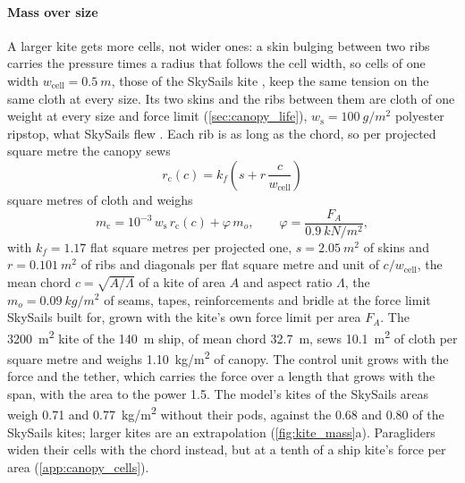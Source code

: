 \paragraph{Mass over size} A larger kite gets more cells, not wider ones: a skin bulging between two ribs carries the pressure times a radius that follows the cell width, so cells of one width $w_\mathrm{cell}=\SI{0.5}{m}$, those of the SkySails kite \citep{folkersma2020}, keep the same tension on the same cloth at every size. Its two skins and the ribs between them are cloth of one weight at every size and force limit (\cref{sec:canopy_life}), $w_\mathrm{s}=\SI{100}{g/m^2}$ polyester ripstop, what SkySails flew \citep{paulig2013}. Each rib is as long as the chord, so per projected square metre the canopy sews
\begin{equation}
r_\mathrm{c}(c) = k_f \left(s + r\,\frac{c}{w_\mathrm{cell}}\right)
\label{eq:canopy_cloth}
\end{equation}
square metres of cloth and weighs
\begin{equation}
m_\mathrm{c} = 10^{-3}\,w_\mathrm{s}\,r_\mathrm{c}(c) + \varphi\,m_o, \qquad \varphi = \frac{F_A}{\SI{0.9}{kN/m^2}},
\label{eq:canopy_mass}
\end{equation}
with $k_f=1.17$ flat square metres per projected one, $s=\SI{2.05}{m^2}$ of skins and $r=\SI{0.101}{m^2}$ of ribs and diagonals per flat square metre and unit of $c/w_\mathrm{cell}$, the mean chord $c=\sqrt{A/\Lambda}$ of a kite of area $A$ and aspect ratio $\Lambda$, the $m_o=\SI{0.09}{kg/m^2}$ of seams, tapes, reinforcements and bridle at the force limit SkySails built for, grown with the kite's own force limit per area $F_A$. The \SI{3200}{m^2} kite of the \SI{140}{m} ship, of mean chord \SI{32.7}{m}, sews \SI{10.1}{m^2} of cloth per square metre and weighs \SI{1.10}{kg/m^2} of canopy. The control unit grows with the force and the tether, which carries the force over a length that grows with the span, with the area to the power 1.5. The model's kites of the SkySails areas weigh 0.71 and \SI{0.77}{kg/m^2} without their pods, against the 0.68 and 0.80 of the SkySails kites; larger kites are an extrapolation (\cref{fig:kite_mass}a). Paragliders widen their cells with the chord instead, but at a tenth of a ship kite's force per area (\cref{app:canopy_cells}).


